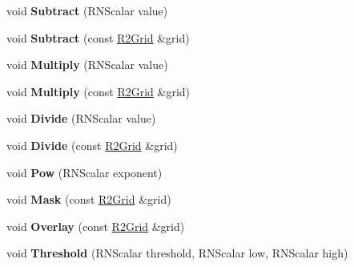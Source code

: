 \begin{DoxyCompactItemize}
\item 
void {\bfseries Subtract} (R\+N\+Scalar value)\hypertarget{class_r2_grid_a2581a386310783375a8f3f8fe2949782}{}\label{class_r2_grid_a2581a386310783375a8f3f8fe2949782}

\item 
void {\bfseries Subtract} (const \hyperlink{class_r2_grid}{R2\+Grid} \&grid)\hypertarget{class_r2_grid_a94b3e3cf043c0fd35cb2bdc1b57bb49c}{}\label{class_r2_grid_a94b3e3cf043c0fd35cb2bdc1b57bb49c}

\item 
void {\bfseries Multiply} (R\+N\+Scalar value)\hypertarget{class_r2_grid_aec87288efd69a0f64df28eace979ead8}{}\label{class_r2_grid_aec87288efd69a0f64df28eace979ead8}

\item 
void {\bfseries Multiply} (const \hyperlink{class_r2_grid}{R2\+Grid} \&grid)\hypertarget{class_r2_grid_ace0b28e792c256e85c14863f23af10ef}{}\label{class_r2_grid_ace0b28e792c256e85c14863f23af10ef}

\item 
void {\bfseries Divide} (R\+N\+Scalar value)\hypertarget{class_r2_grid_a499fac85cb2532e6f211865479cee705}{}\label{class_r2_grid_a499fac85cb2532e6f211865479cee705}

\item 
void {\bfseries Divide} (const \hyperlink{class_r2_grid}{R2\+Grid} \&grid)\hypertarget{class_r2_grid_af459fcae09895573406007f47b6f2e65}{}\label{class_r2_grid_af459fcae09895573406007f47b6f2e65}

\item 
void {\bfseries Pow} (R\+N\+Scalar exponent)\hypertarget{class_r2_grid_aa189d7e0e45f4fb21ac81fe3359c3c62}{}\label{class_r2_grid_aa189d7e0e45f4fb21ac81fe3359c3c62}

\item 
void {\bfseries Mask} (const \hyperlink{class_r2_grid}{R2\+Grid} \&grid)\hypertarget{class_r2_grid_aca78f02c6be6057682305a4825fd1c80}{}\label{class_r2_grid_aca78f02c6be6057682305a4825fd1c80}

\item 
void {\bfseries Overlay} (const \hyperlink{class_r2_grid}{R2\+Grid} \&grid)\hypertarget{class_r2_grid_ae439f68642fc138f4398a58d327d7ed9}{}\label{class_r2_grid_ae439f68642fc138f4398a58d327d7ed9}

\item 
void {\bfseries Threshold} (R\+N\+Scalar threshold, R\+N\+Scalar low, R\+N\+Scalar high)\hypertarget{class_r2_grid_a528045cd7443221554a885a812704cde}{}\label{class_r2_grid_a528045cd7443221554a885a812704cde}


\end{DoxyCompactItemize}
